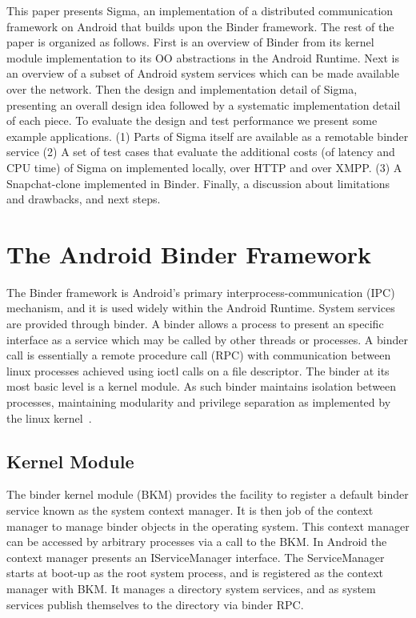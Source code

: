 \documentclass[prodmode]{acmlarge}
\begin{document}
This paper presents Sigma, an implementation of a distributed communication framework on Android that builds upon the Binder framework. The rest of the paper is organized as follows. First is an overview of Binder from its kernel module implementation to its OO abstractions in the Android Runtime. Next is an overview of a subset of Android system services which can be made available over the network. Then the design and implementation detail of Sigma, presenting an overall design idea followed by a systematic implementation detail of each piece. To evaluate the design and test performance we present some example applications. (1) Parts of Sigma itself are available as a remotable binder service (2) A set of test cases that evaluate the additional costs (of latency and CPU time) of Sigma on implemented locally, over HTTP and over XMPP. (3) A Snapchat-clone implemented in Binder. Finally, a discussion about limitations and drawbacks, and next steps.

\section{The Android Binder Framework}
The Binder framework is Android's primary interprocess-communication (IPC) mechanism, and it is used widely within the Android Runtime. System services are provided through binder.
A binder allows a process to present an specific interface as a service which may be called by other threads or processes. A binder call is essentially a remote procedure call (RPC) with communication between linux processes achieved using ioctl calls on a file descriptor. The binder at its most basic level is a kernel module. As such binder maintains isolation between processes, maintaining modularity and privilege separation as implemented by the linux kernel~\cite{OpenBinder}.

\subsection{Kernel Module}
The binder kernel module (BKM) provides the facility to register a default binder service known as the system context manager. It is then job of the context manager to manage binder objects in the operating system. This context manager can be accessed by arbitrary processes via a call to the BKM. In Android the context manager presents an IServiceManager interface. The ServiceManager starts at boot-up as the root system process, and is registered as the context manager with BKM. It manages a directory system services, and as system services publish themselves to the directory via binder RPC.
\end{document}
